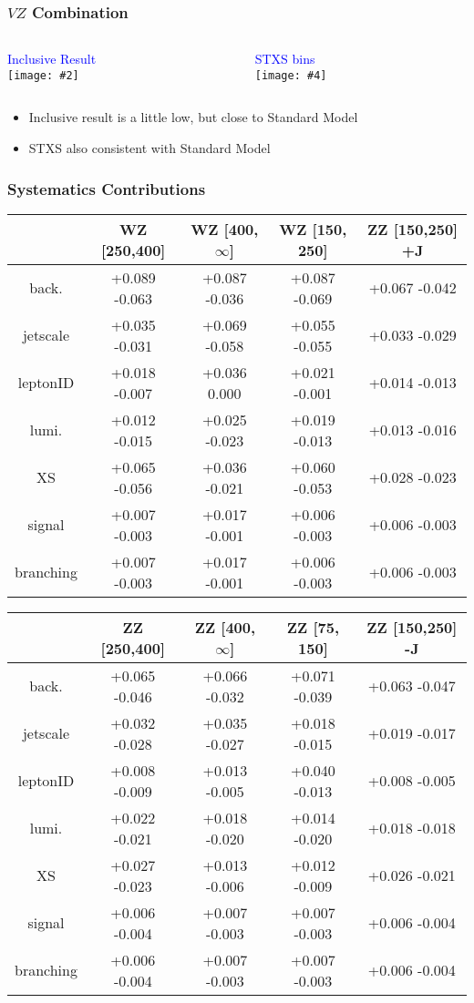 \documentclass{beamer}
\newcommand{\twofigs}[4]{
  \begin{columns}
    \begin{column}{0.5\linewidth}
      \centering
      \textcolor{blue}{#1} \\
      \texttt{[image: \#2]}
    \end{column}
    \begin{column}{0.5\linewidth}
      \centering
      \textcolor{blue}{#3} \\
      \texttt{[image: \#4]}
    \end{column}
  \end{columns}
}
\begin{document}
\begin{frame}
  \frametitle{$V\!Z$ Combination}

  \twofigs{Inclusive Result}
          {201118_inclVZ/scan_nominal_r.pdf}
          {STXS bins}
          {201118_STXS_VZ/summary_stxs.pdf}

  \begin{itemize}
  \item Inclusive result is a little low, but close to Standard Model
  \item STXS also consistent with Standard Model
  \end{itemize}

\end{frame}

\begin{frame}
  \frametitle{Systematics Contributions}

  \centering
  {\footnotesize
  \begin{tabular}{|c|c|c|c|c|}
\hline
& WZ [250,400] & WZ [400, $\infty$] & WZ [150, 250] & ZZ [150,250] +J \\
\hline
back. & +0.089  -0.063 & +0.087  -0.036 & +0.087  -0.069  & +0.067  -0.042 \\
jetscale & +0.035  -0.031 & +0.069  -0.058 & +0.055  -0.055 & +0.033  -0.029 \\
leptonID & +0.018  -0.007 & +0.036  0.000 & +0.021  -0.001 & +0.014  -0.013 \\
lumi. & +0.012  -0.015 & +0.025  -0.023 & +0.019  -0.013 & +0.013  -0.016 \\
XS & +0.065  -0.056 & +0.036  -0.021 & +0.060  -0.053 & +0.028  -0.023 \\
signal & +0.007  -0.003 & +0.017  -0.001 & +0.006  -0.003 & +0.006  -0.003 \\
branching & +0.007  -0.003 & +0.017  -0.001 & +0.006  -0.003 & +0.006  -0.003 \\
\hline
\end{tabular}

  \begin{tabular}{|c|c|c|c|c|}
\hline
& ZZ [250,400] & ZZ [400, $\infty$] & ZZ [75, 150] & ZZ [150,250] -J \\
\hline
back. & +0.065  -0.046 & +0.066  -0.032 & +0.071  -0.039 & +0.063  -0.047\\
jetscale & +0.032  -0.028 & +0.035  -0.027 & +0.018  -0.015 & +0.019  -0.017 \\
leptonID & +0.008  -0.009 & +0.013  -0.005 & +0.040  -0.013 & +0.008  -0.005 \\
lumi. & +0.022  -0.021 & +0.018  -0.020 & +0.014  -0.020 & +0.018  -0.018 \\
XS & +0.027  -0.023 & +0.013  -0.006 & +0.012  -0.009 & +0.026  -0.021 \\
signal & +0.006  -0.004 & +0.007  -0.003 & +0.007  -0.003 & +0.006  -0.004 \\
branching & +0.006  -0.004 & +0.007  -0.003 & +0.007  -0.003 & +0.006  -0.004 \\
\hline
\end{tabular}
}

\end{frame}
\end{document}
